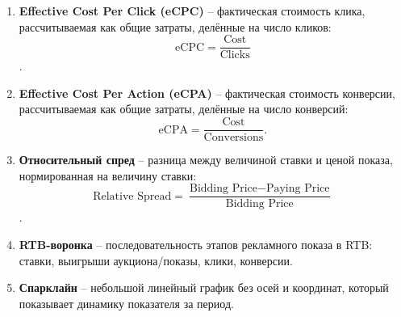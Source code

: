 \begin{enumerate}
\item \textbf{Effective Cost Per Click (eCPC)} -- фактическая стоимость клика, рассчитываемая как общие затраты, делённые на число кликов: \[\text{eCPC}=\frac{\text{Cost}}{\text{Clicks}}\].

\item \textbf{Effective Cost Per Action (eCPA)} -- фактическая стоимость конверсии, рассчитываемая как общие затраты, делённые на число конверсий:\[\text{eCPA}=\frac{\text{Cost}}{\text{Conversions}}.\]

\item \textbf{Относительный спред} -- разница между величиной ставки и ценой показа, нормированная на величину ставки: \[\text{Relative Spread}=\frac{\text{Bidding Price} - \text{Paying Price}}{\text{Bidding Price}}\].

\item \textbf{RTB-воронка} -- последовательность этапов рекламного показа в RTB: ставки, выигрыши аукциона/показы, клики, конверсии.

\item \textbf{Спарклайн} -- небольшой линейный график без осей и координат, который показывает динамику показателя за период.

\end{enumerate}

